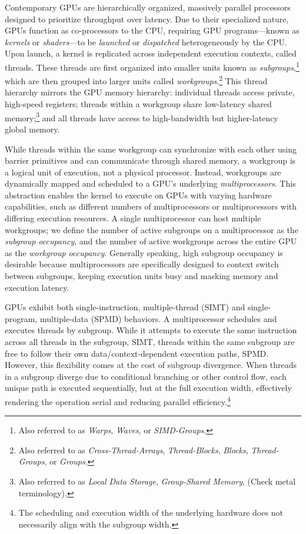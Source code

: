 \documentclass[sigconf]{acmart}
\begin{document}
Contemporary GPUs are hierarchically organized, massively parallel processors designed to prioritize throughput over latency. Due to their specialized nature, GPUs function as co-processors to the CPU, requiring GPU programs—known as \emph{kernels} or \emph{shaders}—to be \emph{launched} or \emph{dispatched} heterogeneously by the CPU\@. Upon launch, a kernel is replicated across independent execution contexts, called threads. These threads are first organized into smaller units known as \emph{subgroups},\footnote{Also referred to as \emph{Warps}, \emph{Waves}, or \emph{SIMD-Groups}.} which are then grouped into larger units called \emph{workgroups}.\footnote{Also referred to as \emph{Cross-Thread-Arrays}, \emph{Thread-Blocks}, \emph{Blocks}, \emph{Thread-Groups}, or \emph{Groups}.} This thread hierarchy mirrors the GPU memory hierarchy: individual threads access private, high-speed registers; threads within a workgroup share low-latency shared memory;\footnote{Also referred to as \emph{Local Data Storage}, \emph{Group-Shared Memory}, (Check metal terminology).} and all threads have access to high-bandwidth but higher-latency global memory.

While threads within the same workgroup can synchronize with each other using barrier primitives and can communicate through shared memory, a workgroup is a logical unit of execution, not a physical processor. Instead, workgroups are dynamically mapped and scheduled to a GPU's underlying \emph{multiprocessors}. This abstraction enables the kernel to execute on GPUs with varying hardware capabilities, such as different numbers of multiprocessors or multiprocessors with differing execution resources. A single multiprocessor can host multiple workgroups; we define the number of active subgroups on a multiprocessor as the \emph{subgroup occupancy}, and the number of active workgroups across the entire GPU as the \emph{workgroup occupancy}. Generally speaking, high subgroup occupancy is desirable because multiprocessors are specifically designed to context switch between subgroups, keeping execution units busy and masking memory and execution latency.

GPUs exhibit both single-instruction, multiple-thread (SIMT) and single-program, multiple-data (SPMD) behaviors. A multiprocessor schedules and executes threads by subgroup. While it attempts to execute the same instruction across all threads in the subgroup, SIMT, threads within the same subgroup are free to follow their own data/context-dependent execution paths, SPMD\@. However, this flexibility comes at the cost of subgroup divergence. When threads in a subgroup diverge due to conditional branching or other control flow, each unique path is executed sequentially, but at the full execution width, effectively rendering the operation serial and reducing parallel efficiency.\footnote{The scheduling and execution width of the underlying hardware does not necessarily align with the subgroup width.}
\end{document}
